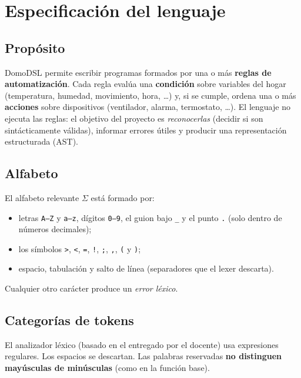 \section{Especificación del lenguaje}

\subsection{Propósito}
DomoDSL permite escribir programas formados por una o más \textbf{reglas de automatización}. Cada regla evalúa una
\textbf{condición} sobre variables del hogar (temperatura, humedad, movimiento, hora, \dots) y, si se cumple, ordena
una o más \textbf{acciones} sobre dispositivos (ventilador, alarma, termostato, \dots). El lenguaje no ejecuta las
reglas: el objetivo del proyecto es \emph{reconocerlas} (decidir si son sintácticamente válidas), informar errores
útiles y producir una representación estructurada (AST).

\subsection{Alfabeto}
El alfabeto relevante $\Sigma$ está formado por:
\begin{itemize}[nosep]
\item letras \texttt{A--Z} y \texttt{a--z}, dígitos \texttt{0--9}, el guion bajo \texttt{\_} y el punto \texttt{.} (solo dentro de números decimales);
\item los símbolos \texttt{>}, \texttt{<}, \texttt{=}, \texttt{!}, \texttt{;}, \texttt{,}, \texttt{(} y \texttt{)};
\item espacio, tabulación y salto de línea (separadores que el lexer descarta).
\end{itemize}
Cualquier otro carácter produce un \emph{error léxico}.

\subsection{Categorías de tokens}
El analizador léxico (basado en el entregado por el docente) usa expresiones regulares. Los espacios se descartan.
Las palabras reservadas \textbf{no distinguen mayúsculas de minúsculas} (como en la función base).

